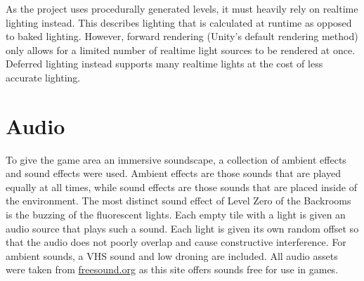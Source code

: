 
As the project uses procedurally generated levels, it must heavily rely on realtime lighting instead. This describes lighting that is calculated at runtime as opposed to baked lighting. However, forward rendering (Unity's default rendering method) only allows for a limited number of realtime light sources to be rendered at once. Deferred lighting instead supports many realtime lights at the cost of less accurate lighting.


\section{Audio}
To give the game area an immersive soundscape, a collection of ambient effects and sound effects were used. Ambient effects are those sounds that are played equally at all times, while sound effects are those sounds that are placed inside of the environment. The most distinct sound effect of Level Zero of the Backrooms is the buzzing of the fluorescent lights. Each empty tile with a light is given an audio source that plays such a sound. Each light is given its own random offset so that the audio does not poorly overlap and cause constructive interference. For ambient sounds, a VHS sound and low droning are included. All audio assets were taken from \url{freesound.org} as this site offers sounds free for use in games.

